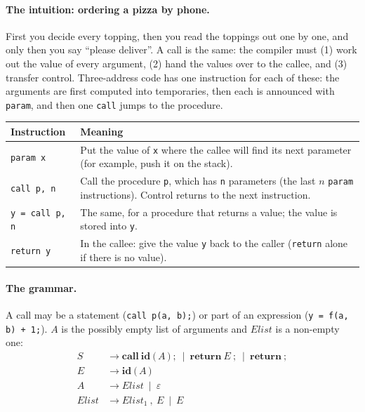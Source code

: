 \documentclass[11pt,a4paper]{article}
\newcommand{\tok}[1]{\ensuremath{\mathtt{#1}}}
\begin{document}
\paragraph{The intuition: ordering a pizza by phone.} First you decide every topping, then you read the toppings out one by one, and only then you say ``please deliver''. A call is the same: the compiler must (1) work out the value of every argument, (2) hand the values over to the callee, and (3) transfer control. Three-address code has one instruction for each of these: the arguments are first computed into temporaries, then each is announced with \texttt{param}, and then one \texttt{call} jumps to the procedure.
\begin{center}
\small
\begin{tabular}{@{}l p{10.4cm}@{}}
\toprule
\textbf{Instruction} & \textbf{Meaning} \\ \midrule
\texttt{param x} & Put the value of \texttt{x} where the callee will find its next parameter (for example, push it on the stack). \\
\texttt{call p, n} & Call the procedure \texttt{p}, which has \texttt{n} parameters (the last $n$ \texttt{param} instructions). Control returns to the next instruction. \\
\texttt{y = call p, n} & The same, for a procedure that returns a value; the value is stored into \texttt{y}. \\
\texttt{return y} & In the callee: give the value \texttt{y} back to the caller (\texttt{return} alone if there is no value). \\ \bottomrule
\end{tabular}
\end{center}

\paragraph{The grammar.} A call may be a statement (\texttt{call p(a, b);}) or part of an expression (\texttt{y = f(a, b) + 1;}). $A$ is the possibly empty list of arguments and $\mathit{Elist}$ is a non-empty one:
\begin{align*}
S &\to \mathbf{call}\ \mathbf{id}\ \tok{(}\,A\,\tok{)}\ \tok{;}\ \mid\ \mathbf{return}\ E\ \tok{;}\ \mid\ \mathbf{return}\ \tok{;}\\
E &\to \mathbf{id}\ \tok{(}\,A\,\tok{)}\\
A &\to \mathit{Elist}\ \mid\ \varepsilon\\
\mathit{Elist} &\to \mathit{Elist}_1\ \tok{,}\ E\ \mid\ E
\end{align*}
\end{document}
